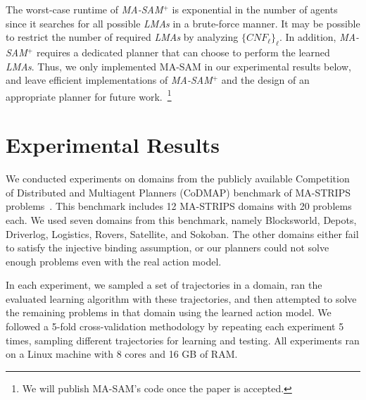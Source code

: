 \documentclass[letterpaper]{article} %
\theoremstyle{definition}
\theoremstyle{remark}
\newcommand{\cnf}{\textit{CNF}}
\newcommand{\liftl}{\ensuremath{\ell}}
\newcommand{\lifta}{\mathsf{a}}
\newcommand{\iseff}{\text{IsEff}}
\newcommand{\masam}{\ac{MA-SAM}\xspace}
\newcommand{\cmasam}{\textit{MA-SAM\ensuremath{^+}}\xspace}
\newcommand{\blmaas}{\textit{LMAs}\xspace}
\newcommand{\pbl}{pb-literal\xspace}
\newcommand{\roni}[1]{{\textcolor{red}{[Roni: #1]}}}
\begin{document}



The worst-case runtime of \cmasam is exponential in the number of agents since it searches for all possible \blmaas in a brute-force manner.
It may be possible to restrict the number of required \blmaas by analyzing $\{\cnf_\liftl\}_\liftl$.
In addition, \cmasam requires a dedicated planner that can choose to perform the learned \blmaas.
Thus, we only implemented \masam in our experimental results below, and leave efficient implementations of \cmasam and the design of an appropriate planner for future work.~\footnote{We will publish \masam's code once the paper is accepted.}


\section{Experimental Results}

We conducted experiments on domains from the publicly available Competition of Distributed and Multiagent Planners (CoDMAP) benchmark of MA-STRIPS problems~\cite{vstolba2016competition}.
This benchmark includes 12 MA-STRIPS domains with 20 problems each.
We used seven domains from this benchmark, namely
Blocksworld, Depots, Driverlog, Logistics, Rovers, Satellite, and Sokoban. %
The other domains either fail to satisfy the injective binding assumption, or our planners could not solve enough problems even with the real action model.

In each experiment, we sampled a set of trajectories in a domain,
ran the evaluated learning algorithm with these trajectories,
and then attempted to solve the remaining problems in that domain using the learned action model.
We followed a 5-fold cross-validation methodology by repeating each experiment 5 times, sampling different trajectories for learning and testing.
All experiments ran on a Linux machine with 8 cores and 16 GB of RAM.
\end{document}
